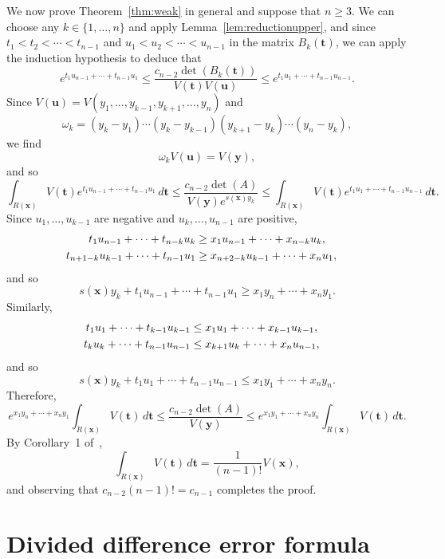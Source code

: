 \documentclass[12pt]{article}
\def\bft{\mathbf{t}}
\def\bfu{\mathbf{u}}
\def\bfx{\mathbf{x}}
\def\bfy{\mathbf{y}}
\begin{document}
We now prove Theorem~\ref{thm:weak} in general and
suppose that $n \ge 3$.
We can choose any $k \in \{1,\ldots,n\}$ and
apply Lemma~\ref{lem:reductionupper}, and since
$t_1 < t_2 < \cdots < t_{n-1}$ and
$u_1 < u_2 < \cdots < u_{n-1}$ in the matrix $B_k(\bft)$,
we can apply the induction hypothesis to deduce that
$$ e^{t_1u_{n-1} + \cdots + t_{n-1}u_1} \le
\frac{c_{n-2}\det(B_k(\bft))}{V(\bft)V(\bfu)}
 \le e^{t_1u_1 + \cdots + t_{n-1}u_{n-1}}. $$
Since $V(\bfu) = V(y_1,\ldots,y_{k-1},y_{k+1},\ldots,y_n)$ and
$$ \omega_k = (y_k-y_1)\cdots(y_k-y_{k-1})
         (y_{k+1}-y_k)\cdots(y_n-y_k), $$
we find
\begin{equation}\label{eq:pkVu}
\omega_k V(\bfu) = V(\bfy),
\end{equation}
and so
$$ \int_{R(\bfx)} V(\bft) e^{t_1u_{n-1} + \cdots + t_{n-1}u_1} \, d\bft
\le \frac{c_{n-2}\det(A)}{V(\bfy)e^{s(\bfx)y_k}} \le
\int_{R(\bfx)} V(\bft) e^{t_1u_1 + \cdots + t_{n-1}u_{n-1}} \, d\bft. $$
Since $u_1,\ldots,u_{k-1}$ are negative
and $u_k,\ldots,u_{n-1}$ are positive,
\begin{align*}
 t_1u_{n-1} + \cdots + t_{n-k}u_k &
\ge x_1u_{n-1} + \cdots + x_{n-k}u_k, \cr
 t_{n+1-k}u_{k-1} + \cdots + t_{n-1}u_1 &
\ge x_{n+2-k}u_{k-1} + \cdots + x_nu_1,
\end{align*}
and so
$$ s(\bfx)y_k + t_1u_{n-1} + \cdots + t_{n-1}u_1
\ge x_1y_n + \cdots + x_ny_1. $$
Similarly,
\begin{align*}
t_1u_1 + \cdots + t_{k-1}u_{k-1}
& \le x_1u_1 + \cdots + x_{k-1}u_{k-1}, \cr
t_ku_k + \cdots + t_{n-1}u_{n-1}
& \le x_{k+1}u_k + \cdots + x_nu_{n-1},
\end{align*}
and so
$$
s(\bfx)y_k + t_1u_1 + \cdots + t_{n-1}u_{n-1}
 \le x_1y_1 + \cdots + x_ny_n. $$
Therefore,
$$ e^{x_1y_n + \cdots + x_ny_1}
\int_{R(\bfx)} V(\bft) \, d\bft
\le \frac{c_{n-2}\det(A)}{V(\bfy)} \le
e^{x_1y_1 + \cdots + x_ny_n}
\int_{R(\bfx)} V(\bft) \, d\bft. $$
By Corollary~1 of~\cite{Floater:2026a},
\begin{equation}\label{eq:floater}
 \int_{R(\bfx)} V(\bft) \, d\bft = \frac{1}{(n-1)!} V(\bfx),
\end{equation}
and observing that $c_{n-2} (n-1)! = c_{n-1}$ completes the proof.

\section{Divided difference error formula}
\end{document}
